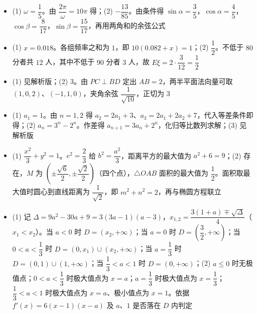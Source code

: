 \begin{itemize}[leftmargin=2.6em]
  \item[\textbf{16.}] (1) $\omega=\dfrac15$。由 $\dfrac{2\pi}{\omega}=10\pi$ 得；(2) $-\dfrac{13}{85}$。由条件得 $\sin\alpha=\dfrac35$，$\cos\alpha=\dfrac45$，$\cos\beta=\dfrac8{17}$，$\sin\beta=\dfrac{15}{17}$，再用两角和的余弦公式
  \item[\textbf{17.}] (1) $x=0.018$。各组频率之和为 $1$，即 $10(0.082+x)=1$；(2) $\dfrac12$。不低于 $80$ 分者共 $12$ 人，其中不低于 $90$ 分者 $3$ 人，故 $E\xi=2\cdot\dfrac3{12}=\dfrac12$
  \item[\textbf{18.}] (1) 见解析版；(2) $3$。由 $PC\perp BD$ 定出 $AB=2$，两半平面法向量可取 $(1,0,2)$、$(-1,1,0)$，夹角余弦 $\dfrac1{\sqrt{10}}$，正切为 $3$
  \item[\textbf{19.}] (1) $a_1=1$。由 $n=1,2$ 得 $a_2=2a_1+3$、$a_3=2a_1+2a_2+7$，代入等差条件即得；(2) $a_n=3^n-2^n$。作差得 $a_{n+1}=3a_n+2^n$，化归等比数列求解；(3) 见解析版
  \item[\textbf{20.}] (1) $\dfrac{x^2}3+y^2=1$。$e^2=\dfrac23$ 给 $b^2=\dfrac{a^2}3$，距离平方的最大值为 $a^2+6=9$；(2) 存在，$M$ 为 $\left(\pm\dfrac{\sqrt6}2,\pm\dfrac{\sqrt2}2\right)$（四个点），$\triangle OAB$ 面积的最大值为 $\dfrac12$。面积取最大值时圆心到直线距离为 $\dfrac1{\sqrt2}$，即 $m^2+n^2=2$，再与椭圆方程联立
  \item[\textbf{21.}] (1) 记 $\Delta=9a^2-30a+9=3(3a-1)(a-3)$，$x_{1,2}=\dfrac{3(1+a)\mp\sqrt\Delta}4$（$x_1<x_2$）。当 $a<0$ 时 $D=(x_2,+\infty)$；当 $a=0$ 时 $D=\left(\dfrac32,+\infty\right)$；当 $0<a<\dfrac13$ 时 $D=(0,x_1)\cup(x_2,+\infty)$；当 $a=\dfrac13$ 时 $D=(0,1)\cup(1,+\infty)$；当 $\dfrac13<a<1$ 时 $D=(0,+\infty)$；(2) $a\leqslant0$ 时无极值点；$0<a<\dfrac13$ 时极大值点为 $x=a$；$a=\dfrac13$ 时极大值点为 $x=\dfrac13$；$\dfrac13<a<1$ 时极大值点为 $x=a$、极小值点为 $x=1$。依据 $f'(x)=6(x-1)(x-a)$ 及 $a$、$1$ 是否落在 $D$ 内判定
\end{itemize}
